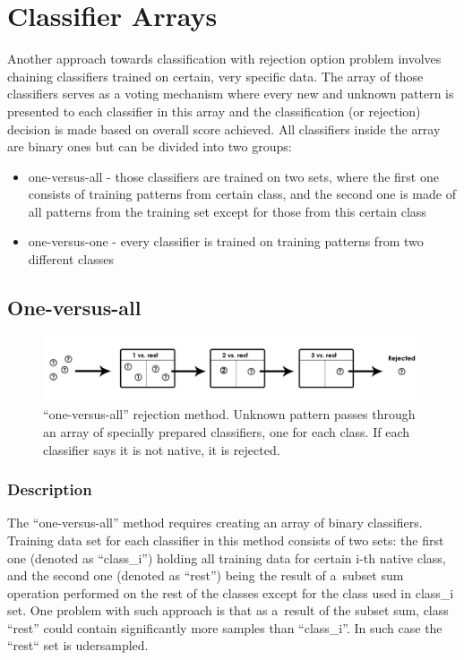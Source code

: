 \chapter{Classifier Arrays}

Another approach towards classification with rejection option problem involves chaining classifiers trained on certain, very specific data. The array of those classifiers serves as a voting mechanism where every new and unknown pattern is presented to each classifier in this array and the classification (or rejection) decision is made based on overall score achieved. All classifiers inside the array are binary ones but can be divided into two groups:
\begin{itemize}
	\item one-versus-all - those classifiers are trained on two sets, where the first one consists of training patterns from certain class, and the second one is made of all patterns from the training set except for those from this certain class
	\item one-versus-one - every classifier is trained on training patterns from two different classes
\end{itemize}

\section{One-versus-all}

\begin{figure}[htp]
	\centering
	\includegraphics[width=1\textwidth]{Figures/classification_with_rejection1.jpg}
	\caption{``one-versus-all'' rejection method. Unknown pattern passes through an array of specially prepared classifiers, one for each class. If each classifier says it is not native, it is rejected. }
	\label{fig:rejection_version1}\vspace{-3pt}
\end{figure}

\subsection{Description}

The ``one-versus-all'' method requires creating an array of binary classifiers. Training data set for each classifier in this method consists of two sets: the first one (denoted as ``class\_i'') holding all training data for certain i-th native class, and the second one (denoted as ``rest'') being the result of a~subset sum operation performed on the rest of the classes except for the class used in class\_i set. One problem with such approach is that as a~result of the subset sum, class ``rest'' could contain significantly more samples than ``class\_i''. In such case the ``rest`` set is udersampled. 

